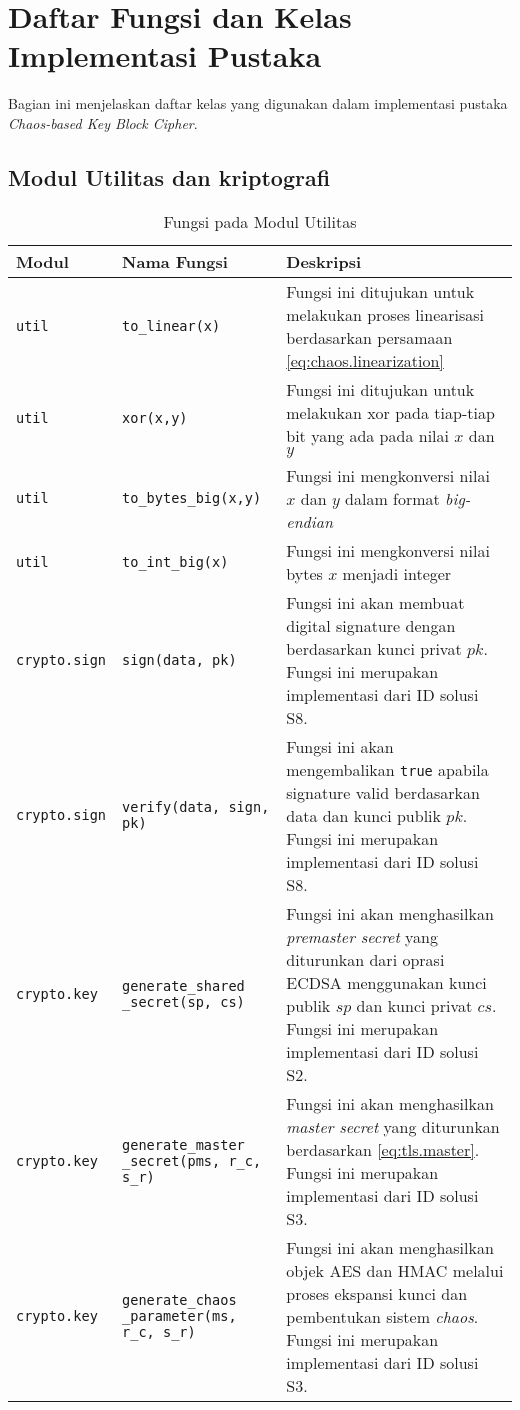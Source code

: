 \chapter{{{Daftar Fungsi dan Kelas Implementasi Pustaka}}} 
\label{appendix:impl}

Bagian ini menjelaskan daftar kelas yang digunakan dalam implementasi pustaka \emph{Chaos-based Key Block Cipher}.

\section{Modul Utilitas dan kriptografi}
\label{appendix:impl.util}

\begin{table}[!h]
  \centering
  \caption{Fungsi pada Modul Utilitas} \label{tab:impl.util}
  \begin{tabular}{|p{2.5cm}|p{3.5cm}|p{8cm}|}
    \hline
    Modul & Nama Fungsi & Deskripsi \\ \hline
    \texttt{util} & \texttt{to\_linear(x)} & Fungsi ini ditujukan untuk melakukan proses linearisasi berdasarkan persamaan \ref{eq:chaos.linearization} \\ \hline
    \texttt{util} & \texttt{xor(x,y)} & Fungsi ini ditujukan untuk melakukan xor pada tiap-tiap bit yang ada pada nilai $x$ dan $y$ \\ \hline
    \texttt{util} & \texttt{to\_bytes\_big(x,y)} & Fungsi ini mengkonversi nilai $x$ dan $y$ dalam format \emph{big-endian} \\ \hline
    \texttt{util} & \texttt{to\_int\_big(x)} & Fungsi ini mengkonversi nilai bytes $x$ menjadi integer\\ \hline
    \texttt{crypto.sign} & \texttt{sign(data, pk)} & Fungsi ini akan membuat digital signature dengan berdasarkan kunci privat $pk$. Fungsi ini merupakan implementasi dari ID solusi S8.\\ \hline
    \texttt{crypto.sign} & \texttt{verify(data, sign, pk)} & Fungsi ini akan mengembalikan \texttt{true} apabila signature valid berdasarkan data dan kunci publik $pk$. Fungsi ini merupakan implementasi dari ID solusi S8.\\ \hline
    \texttt{crypto.key} & \texttt{generate\_shared} \texttt{\_secret(sp, cs)} & Fungsi ini akan menghasilkan \emph{premaster secret} yang diturunkan dari oprasi ECDSA menggunakan kunci publik $sp$ dan kunci privat $cs$. Fungsi ini merupakan implementasi dari ID solusi S2.\\ \hline
    \texttt{crypto.key} & \texttt{generate\_master} \texttt{\_secret(pms, r\_c, s\_r)} & Fungsi ini akan menghasilkan \emph{master secret} yang diturunkan berdasarkan \ref{eq:tls.master}. Fungsi ini merupakan implementasi dari ID solusi S3.\\ \hline
    \texttt{crypto.key} & \texttt{generate\_chaos} \texttt{\_parameter(ms, r\_c, s\_r)} & Fungsi ini akan menghasilkan objek AES dan HMAC melalui proses ekspansi kunci dan pembentukan sistem \emph{chaos}. Fungsi ini merupakan implementasi dari ID solusi S3.\\ \hline
  \end{tabular}
\end{table}

